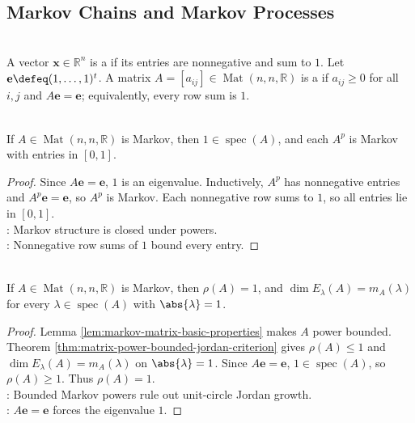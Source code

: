 \subsection{Markov Chains and Markov Processes}

\begin{definition} \label{def:probability-vector-and-markov-matrix} \\
A vector $\mathbf{x}\in\mathbb{R}^n$ is a  if its entries are nonnegative and sum to $1$. Let $\mathbf{e}\defeq(1,\ldots,1)^t$. A matrix $A=[a_{ij}]\in\operatorname{Mat}(n,n,\mathbb{R})$ is a  if $a_{ij}\geq0$ for all $i,j$ and $A\mathbf{e}=\mathbf{e}$; equivalently, every row sum is $1$.
\end{definition}

\begin{lemma} \label{lem:markov-matrix-basic-properties} \\
If $A\in\operatorname{Mat}(n,n,\mathbb{R})$ is Markov, then $1\in\operatorname{spec}(A)$, and each $A^p$ is Markov with entries in $[0,1]$.
\begin{proof}
Since $A\mathbf{e}=\mathbf{e}$, $1$ is an eigenvalue. Inductively, $A^p$ has nonnegative entries and $A^p\mathbf{e}=\mathbf{e}$, so $A^p$ is Markov. Each nonnegative row sums to $1$, so all entries lie in $[0,1]$.\\
: Markov structure is closed under powers.\\
: Nonnegative row sums of $1$ bound every entry.
\end{proof}
\end{lemma}

\begin{theorem} \label{thm:markov-matrix-unit-circle-semisimple} \\
If $A\in\operatorname{Mat}(n,n,\mathbb{R})$ is Markov, then $\rho(A)=1$, and $\dim E_{\lambda}(A)=m_A(\lambda)$ for every $\lambda\in\operatorname{spec}(A)$ with $\abs{\lambda}=1$.
\begin{proof}
Lemma \ref{lem:markov-matrix-basic-properties} makes $A$ power bounded. Theorem \ref{thm:matrix-power-bounded-jordan-criterion} gives $\rho(A)\leq1$ and $\dim E_{\lambda}(A)=m_A(\lambda)$ on $\abs{\lambda}=1$. Since $A\mathbf{e}=\mathbf{e}$, $1\in\operatorname{spec}(A)$, so $\rho(A)\geq1$. Thus $\rho(A)=1$.\\
: Bounded Markov powers rule out unit-circle Jordan growth.\\
: $A\mathbf{e}=\mathbf{e}$ forces the eigenvalue $1$.
\end{proof}
\end{theorem}

